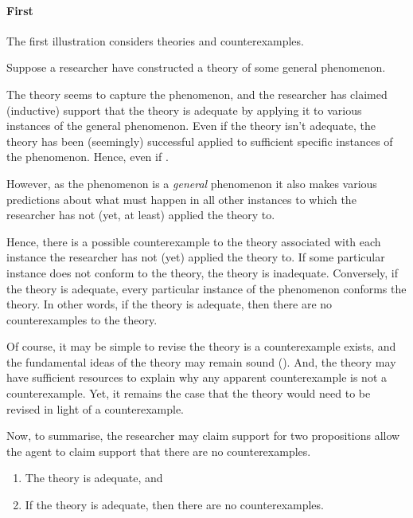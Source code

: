 \paragraph{First}

\begin{note}
  The first illustration considers theories and counterexamples.

  \begin{illustration}
    \label{ill:CE:main}
    Suppose a researcher have constructed a theory of some general phenomenon.

    The theory seems to capture the phenomenon, and the researcher has claimed (inductive) support that the theory is adequate by applying it to various instances of the general phenomenon.
    Even if the theory isn't adequate, the theory has been (seemingly) successful applied to sufficient specific instances of the phenomenon.
    Hence, even if \mom{}.

    However, as the phenomenon is a \emph{general} phenomenon it also makes various predictions about what must happen in all other instances to which the researcher has not (yet, at least) applied the theory to.

    Hence, there is a possible counterexample to the theory associated with each instance the researcher has not (yet) applied the theory to.
    If some particular instance does not conform to the theory, the theory is inadequate.
    Conversely, if the theory is adequate, every particular instance of the phenomenon conforms the theory.
    In other words, if the theory is adequate, then there are no counterexamples to the theory.

    Of course, it may be simple to revise the theory is a counterexample exists, and the fundamental ideas of the theory may remain sound (\cite[Cf.][]{Bonevac:2011tz}).
    And, the theory may have sufficient resources to explain why any apparent counterexample is not a counterexample.
    Yet, it remains the case that the theory would need to be revised in light of a counterexample.

    Now, to summarise, the researcher may claim support for two propositions allow the agent to claim support that there are no counterexamples.

    \begin{enumerate}
    \item The theory is adequate, and
    \item If the theory is adequate, then there are no counterexamples.
    \end{enumerate}


\end{illustration}
\end{note}
